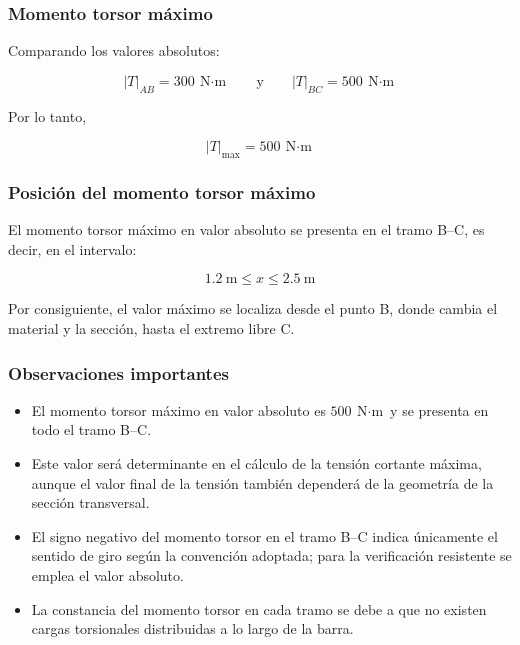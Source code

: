 \documentclass[12pt,a4paper]{article}
\begin{document}
\begin{enumerate}
\subsubsection*{Momento torsor máximo}

Comparando los valores absolutos:

\begin{equation}
|T|_{AB} = 300\ \text{N$\cdot$m}
\qquad \text{y} \qquad
|T|_{BC} = 500\ \text{N$\cdot$m}
\end{equation}

Por lo tanto,

\begin{equation}
\boxed{|T|_{\max} = 500\ \text{N$\cdot$m}}
\end{equation}

\subsubsection*{Posición del momento torsor máximo}

El momento torsor máximo en valor absoluto se presenta en el tramo B--C, es decir, en el intervalo:

\begin{equation}
\boxed{1.2\ \text{m} \leq x \leq 2.5\ \text{m}}
\end{equation}

Por consiguiente, el valor máximo se localiza desde el punto B, donde cambia el material y la sección, hasta el extremo libre C.


\subsubsection*{Observaciones importantes}

\begin{itemize}
    \item El momento torsor máximo en valor absoluto es $500\ \text{N$\cdot$m}$ y se presenta en todo el tramo B--C.
    \item Este valor será determinante en el cálculo de la tensión cortante máxima, aunque el valor final de la tensión también dependerá de la geometría de la sección transversal.
    \item El signo negativo del momento torsor en el tramo B--C indica únicamente el sentido de giro según la convención adoptada; para la verificación resistente se emplea el valor absoluto.
    \item La constancia del momento torsor en cada tramo se debe a que no existen cargas torsionales distribuidas a lo largo de la barra.
\end{itemize}


\end{enumerate}
\end{document}
